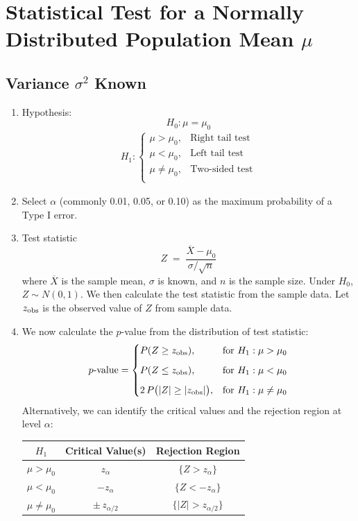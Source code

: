 \documentclass[twoside]{book}
\begin{document}
\section{Statistical Test for a Normally Distributed Population Mean \(\mu\)}

\subsection{Variance $\sigma^2$ Known}

\begin{enumerate}
	\item Hypothesis:
	$$H_0: \mu = \mu_0$$
	\begin{align*}
	H_1: \begin{cases}
	\mu > \mu_0, & \text{Right tail test}\\[6pt]
	\mu < \mu_0, & \text{Left tail test}\\[6pt]
	\mu \neq \mu_0, & \text{Two-sided test}\\[6pt]
	\end{cases}
	\end{align*}

	\item Select \(\alpha\) (commonly 0.01, 0.05, or 0.10) as the maximum probability of a Type I error.

	\item Test statistic
	\[
	Z \;=\;\frac{\overline{X} - \mu_0}{\sigma / \sqrt{n}}
	\]
	where \(\overline{X}\) is the sample mean, \(\sigma\) is known, and \(n\) is the sample size.  Under \(H_0\), \(Z \sim N(0,1)\). We then calculate the test statistic from the sample data. Let \(z_{\rm obs}\) is the observed value of \(Z\) from sample data.

	\item We now calculate the \(p\)-value from the distribution of test statistic:
		\[
		p\text{-value} =
		\begin{cases}
		P(Z \ge z_{\rm obs}), & \text{for }H_1:\mu>\mu_0\\[6pt]
		P(Z \le z_{\rm obs}), & \text{for }H_1:\mu<\mu_0\\[6pt]
		2\,P\bigl(|Z| \ge |z_{\rm obs}|\bigr), & \text{for }H_1:\mu\neq\mu_0
		\end{cases}
		\]
	Alternatively, we can identify the critical values and the rejection region at level $\alpha$:
	\begin{table}[H]
		\centering
		\begin{tabular}{@{}c|c|c@{}}
			\toprule
			\textbf{$H_1$} & \textbf{Critical Value(s)} & \textbf{Rejection Region} \\
			\midrule
			$\mu > \mu_0$ & $ z_{\alpha} $ &
			\(\{Z>z_{\alpha}\}\) \\[6pt]
			$\mu < \mu_0$ &
			$ -z_{\alpha} $ &
			\(\{Z<-z_{\alpha}\}\) \\[6pt]
			$\mu \neq \mu_0$ &
			$ \pm\,z_{\alpha/2} $&
			$\{|Z| > z_{\alpha/2}\}$ \\
			\bottomrule
		\end{tabular}
	\end{table}


\end{enumerate}
\end{document}
